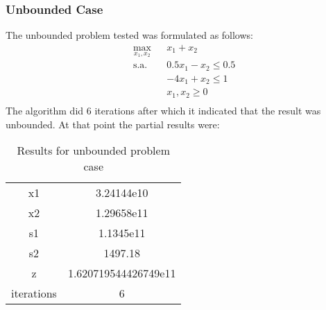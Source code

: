 \documentclass[a4paper]{IEEEtran}
\begin{document}
\subsubsection{Unbounded Case}
The unbounded problem tested was formulated as follows:
       \begin{equation}
        \begin{aligned}
            & \underset{x_1, x_2}{\text{max}}
            & & x_1 + x_2\\
            & \text{s.a.}
            & & 0.5x_1  -x_2 \leq 0.5 \\
            &&& -4x_1 + x_2 \leq 1 \\
            &&& x_1, x_2 \geq 0 \\
        \end{aligned}
    \end{equation}
     The algorithm did 6 iterations after which it indicated that the result was unbounded. At that point the partial results were:\\
        \begin{table}[H]
            \centering
            \begin{tabular}{c|c}
                 {x1} & 3.24144e10\\
                {x2} &  1.29658e11\\
                {s1} & 1.1345e11\\
                {s2} & 1497.18\\
                {z} & 1.620719544426749e11\\
            iterations  & 6 \\
            \end{tabular}
            \caption{Results for unbounded problem case}
            \label{tab:3}
        \end{table}
        
\end{document}
